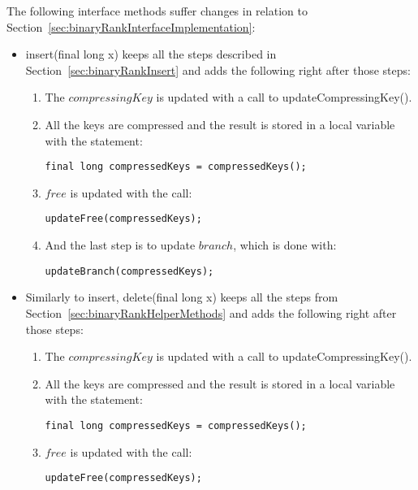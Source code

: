 The following interface methods suffer changes in relation to Section~\ref{sec:binaryRankInterfaceImplementation}:
\begin{itemize}
    \item
    {\ttfamily insert(final long x)} keeps all the steps described in Section~\ref{sec:binaryRankInsert} and adds the following right after those steps:
    \begin{enumerate}
        \item
        The $compressingKey$ is updated with a call to {\ttfamily updateCompressingKey()}.
        
        \item
        All the keys are compressed and the result is stored in a local variable with the statement:
        \begin{lstlisting}
final long compressedKeys = compressedKeys();
        \end{lstlisting}
        
        \item
        $free$ is updated with the call:
        \begin{lstlisting}
updateFree(compressedKeys);
        \end{lstlisting}
        
        \item
        And the last step is to update $branch$, which is done with:
        \begin{lstlisting}
updateBranch(compressedKeys);
        \end{lstlisting}
    \end{enumerate}
    
    \item
    Similarly to {\ttfamily insert}, {\ttfamily delete(final long x)} keeps all the steps from Section~\ref{sec:binaryRankHelperMethods} and adds the following right after those steps:
    \begin{enumerate}
        \item
        The $compressingKey$ is updated with a call to {\ttfamily updateCompressingKey()}.
        
        \item
        All the keys are compressed and the result is stored in a local variable with the statement:
        \begin{lstlisting}
final long compressedKeys = compressedKeys();
        \end{lstlisting}
        
        \item
        $free$ is updated with the call:
        \begin{lstlisting}
updateFree(compressedKeys);
        \end{lstlisting}
        

\end{enumerate}
\end{itemize}
